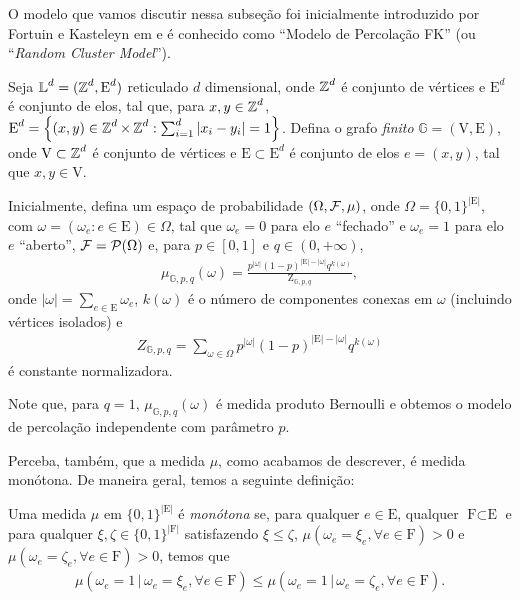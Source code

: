 O modelo que vamos discutir nessa subseção foi inicialmente introduzido por Fortuin e Kasteleyn em \cite{fortuin1972random} e é conhecido como ``Modelo de Percolação FK'' (ou ``\textit{Random Cluster Model}'').

Seja $\operatorname{\mathbb{L}}^d = (\operatorname{\mathbb{Z}}^d, \text{E}^d)$ reticulado $d$ dimensional, onde $\operatorname{\mathbb{Z}}^d$ é conjunto de vértices e $\text{E}^d$ é conjunto de elos, tal que, para $x, y \in \operatorname{\mathbb{Z}}^d$, $\text{E}^d = \left\{(x, y) \in \operatorname{\mathbb{Z}}^d \times \operatorname{\mathbb{Z}}^d : \sum_{i = 1}^{d} |x_i - y_i| = 1\right\}$. Defina o grafo \textit{finito} $\mathbb{G} = (\text{V}, \text{E})$, onde $\text{V} \subset \operatorname{\mathbb{Z}}^d$ é conjunto de vértices e $\text{E} \subset \text{E}^d$ é conjunto de elos $e = (x, y)$, tal que $x, y \in \text{V}$.

Inicialmente, defina um espaço de probabilidade $(\Omega, \operatorname{\mathcal{F}}, \mu)$, onde $\Omega = \{0, 1\}^{|\text{E}|}$, com $\omega = (\omega_e: e \in \text{E}) \in \Omega$, tal que  $\omega_e = 0$ para elo $e$ ``fechado'' e $\omega_e = 1$ para elo $e$ ``aberto'', $\operatorname{\mathcal{F}} = \mathcal{P}(\Omega)$ e, para $p \in [0, 1]$ e $q \in (0, +\infty)$,
\begin{align*}
\mu_{\mathbb{G}, p, q}(\omega) = \frac{p^{|\omega|} (1 - p)^{|\text{E}| - |\omega|} q^{k(\omega)}}{\text{Z}_{\mathbb{G}, p, q}},
\end{align*}
onde $|\omega| = \sum_{e \in \text{E}} \omega_e$, $k(\omega)$ é o número de componentes conexas em $\omega$ (incluindo vértices isolados) e
\begin{align*}
Z_{\mathbb{G}, p, q} = \sum_{\omega \in \Omega} p^{|\omega|} (1 - p)^{|\text{E}| - |\omega|} q^{k(\omega)}
\end{align*}
é constante normalizadora.

Note que, para $q = 1$, $\mu_{\mathbb{G}, p, q}(\omega)$ é medida produto Bernoulli e obtemos o modelo de percolação independente com parâmetro $p$.

Perceba, também, que a medida $\mu$, como acabamos de descrever, é medida monótona. De maneira geral, temos a seguinte definição:

\begin{mydef} \label{def-medidamonotona}
	Uma medida $\mu$ em $\{0, 1\}^{|\text{E}|}$ é \textit{monótona} se, para qualquer $e \in \text{E}$, qualquer $\text{F} \subset \text{E}$ e para qualquer $\xi, \zeta \in \{0, 1\}^{|\text{F}|}$ satisfazendo $\xi \leq \zeta$, $\mu(\omega_e = \xi_e, \forall e \in \text{F}) > 0$ e $\mu(\omega_e = \zeta_e, \forall e \in \text{F}) > 0$, temos que\vspace{-6pt}
	\begin{align*}
		\mu(\omega_e = 1 \,|\, \omega_e = \xi_e, \forall e \in \text{F}) \leq \mu(\omega_e = 1 \,|\, \omega_e = \zeta_e, \forall e \in \text{F}).
	\end{align*}
\end{mydef}

